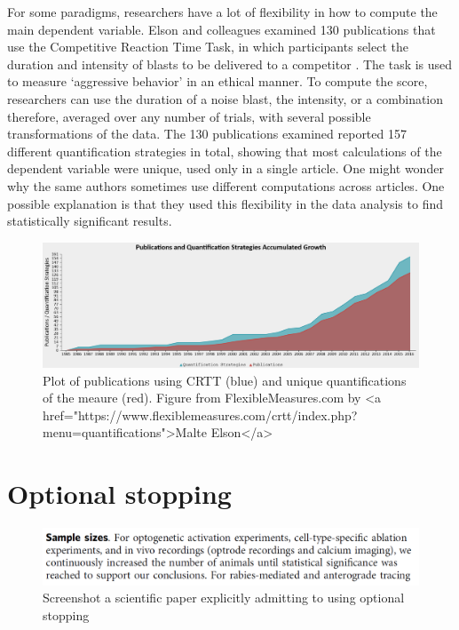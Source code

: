 \documentclass[
  oneside]{book}
\begin{document}
For some paradigms, researchers have a lot of flexibility in how to compute the main dependent variable. Elson and colleagues examined 130 publications that use the Competitive Reaction Time Task, in which participants select the duration and intensity of blasts to be delivered to a competitor \citep{elson_press_2014}. The task is used to measure `aggressive behavior' in an ethical manner. To compute the score, researchers can use the duration of a noise blast, the intensity, or a combination therefore, averaged over any number of trials, with several possible transformations of the data. The 130 publications examined reported 157 different quantification strategies in total, showing that most calculations of the dependent variable were unique, used only in a single article. One might wonder why the same authors sometimes use different computations across articles. One possible explanation is that they used this flexibility in the data analysis to find statistically significant results.

\begin{figure}

{\centering \includegraphics[width=1\linewidth]{images/flexiblemeasure} 

}

\caption{Plot of publications using CRTT (blue) and unique quantifications of the meaure (red). Figure from FlexibleMeasures.com by <a href="https://www.flexiblemeasures.com/crtt/index.php?menu=quantifications">Malte Elson</a>}\label{fig:flexiblemeasure}
\end{figure}

\hypertarget{optionalstopping}{%
\section{Optional stopping}\label{optionalstopping}}

\begin{figure}

{\centering \includegraphics[width=1\linewidth]{images/optionalstoppingexample} 

}

\caption{Screenshot a scientific paper explicitly admitting to using optional stopping}\label{fig:optionalstoppingexample}
\end{figure}
\end{document}
